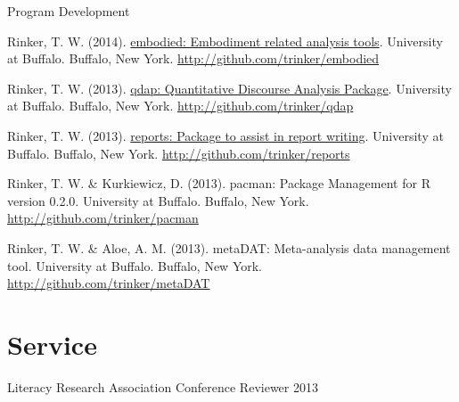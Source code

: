 Program Development
\begin{innerlist}
    \item Rinker, T. W. (2014). \href{http://github.com/trinker/embodied}{embodied: Embodiment related analysis tools}.  University at Buffalo. Buffalo, New York. \url{http://github.com/trinker/embodied}
    \item Rinker, T. W. (2013). \href{http://cran.r-project.org/web/packages/qdap/index.html}{qdap: Quantitative Discourse Analysis Package}. University at Buffalo. Buffalo, New York. \url{http://github.com/trinker/qdap}
    \item Rinker, T. W. (2013). \href{http://cran.r-project.org/web/packages/reports/index.html}{reports: Package to assist in report writing}. University at Buffalo. Buffalo, New York. \url{http://github.com/trinker/reports}
    \item Rinker, T. W. \& Kurkiewicz, D. (2013). pacman: Package Management for R version 0.2.0. University at Buffalo. Buffalo, New York. \url{http://github.com/trinker/pacman}
    \item Rinker, T. W. \& Aloe, A. M. (2013). metaDAT: Meta-analysis data management tool.  University at Buffalo. Buffalo, New York. \\ \url{http://github.com/trinker/metaDAT}
\end{innerlist}

\section{Service}

\begin{innerlist}
    \item Literacy Research Association Conference Reviewer \hfill {2013}
\end{innerlist}


\halfblankline




